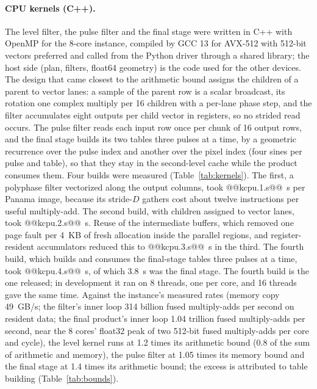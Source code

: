 \documentclass[11pt]{article}
\begin{document}
\paragraph{CPU kernels (C++).} The level filter, the pulse filter and the final stage were written in C++ with OpenMP for the 8-core instance, compiled by GCC 13 for AVX-512 with 512-bit vectors preferred and called from the Python driver through a shared library; the host side (plan, filters, float64 geometry) is the code used for the other devices. The design that came closest to the arithmetic bound assigns the children of a parent to vector lanes: a sample of the parent row is a scalar broadcast, its rotation one complex multiply per 16 children with a per-lane phase step, and the filter accumulates eight outputs per child vector in registers, so no strided read occurs. The pulse filter reads each input row once per chunk of 16 output rows, and the final stage builds its two tables three pulses at a time, by a geometric recurrence over the pulse index and another over the pixel index (four sines per pulse and table), so that they stay in the second-level cache while the product consumes them. Four builds were measured (Table~\ref{tab:kernels}). The first, a polyphase filter vectorized along the output columns, took @@kcpu.1.s@@~s per Panama image, because its stride-$D$ gathers cost about twelve instructions per useful multiply-add. The second build, with children assigned to vector lanes, took @@kcpu.2.s@@~s. Reuse of the intermediate buffers, which removed one page fault per 4~KB of fresh allocation inside the parallel regions, and register-resident accumulators reduced this to @@kcpu.3.s@@~s in the third. The fourth build, which builds and consumes the final-stage tables three pulses at a time, took @@kcpu.4.s@@~s, of which 3.8~s was the final stage. The fourth build is the one released; in development it ran on 8 threads, one per core, and 16 threads gave the same time. Against the instance's measured rates (memory copy 49~GB/s; the filter's inner loop 314 billion fused multiply-adds per second on resident data; the final product's inner loop 1.04 trillion fused multiply-adds per second, near the 8 cores' float32 peak of two 512-bit fused multiply-adds per core and cycle), the level kernel runs at 1.2 times its arithmetic bound (0.8 of the sum of arithmetic and memory), the pulse filter at 1.05 times its memory bound and the final stage at 1.4 times its arithmetic bound; the excess is attributed to table building (Table~\ref{tab:bounds}).

\end{document}
